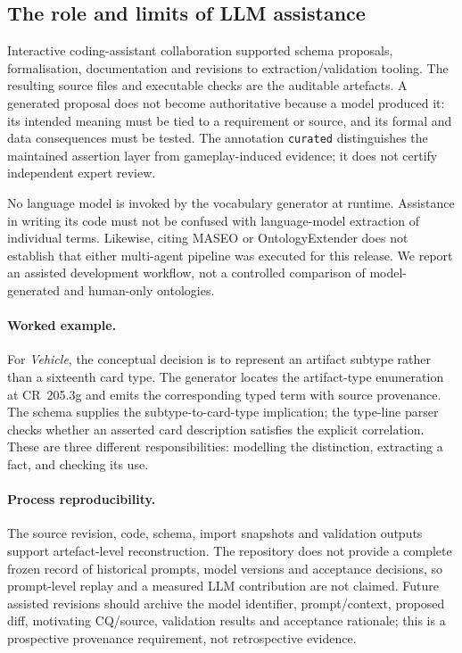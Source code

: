 \documentclass[11pt,a4paper]{article}
\begin{document}
\subsection{The role and limits of LLM assistance}

Interactive coding-assistant collaboration supported schema proposals, formalisation, documentation and revisions to extraction/validation tooling. The resulting source files and executable checks are the auditable artefacts. A generated proposal does not become authoritative because a model produced it: its intended meaning must be tied to a requirement or source, and its formal and data consequences must be tested. The annotation \texttt{curated} distinguishes the maintained assertion layer from gameplay-induced evidence; it does not certify independent expert review.

No language model is invoked by the vocabulary generator at runtime. Assistance in writing its code must not be confused with language-model extraction of individual terms. Likewise, citing MASEO or OntologyExtender does not establish that either multi-agent pipeline was executed for this release. We report an assisted development workflow, not a controlled comparison of model-generated and human-only ontologies.

\paragraph{Worked example.} For \emph{Vehicle}, the conceptual decision is to represent an artifact subtype rather than a sixteenth card type. The generator locates the artifact-type enumeration at CR~205.3g and emits the corresponding typed term with source provenance. The schema supplies the subtype-to-card-type implication; the type-line parser checks whether an asserted card description satisfies the explicit correlation. These are three different responsibilities: modelling the distinction, extracting a fact, and checking its use.

\paragraph{Process reproducibility.} The source revision, code, schema, import snapshots and validation outputs support artefact-level reconstruction. The repository does not provide a complete frozen record of historical prompts, model versions and acceptance decisions, so prompt-level replay and a measured LLM contribution are not claimed. Future assisted revisions should archive the model identifier, prompt/context, proposed diff, motivating CQ/source, validation results and acceptance rationale; this is a prospective provenance requirement, not retrospective evidence.
\end{document}
